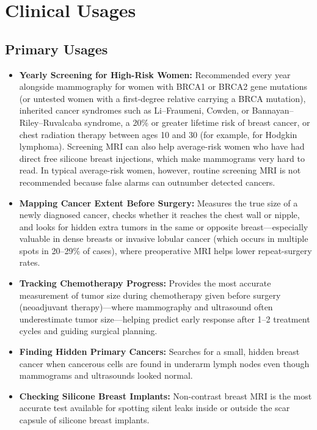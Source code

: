 \section{Clinical Usages}

\subsection{Primary Usages}
\begin{itemize}
\item \textbf{Yearly Screening for High-Risk Women:} Recommended every year alongside mammography for women with BRCA1 or BRCA2 gene mutations (or untested women with a first-degree relative carrying a BRCA mutation), inherited cancer syndromes such as Li--Fraumeni, Cowden, or Bannayan--Riley--Ruvalcaba syndrome, a 20\% or greater lifetime risk of breast cancer, or chest radiation therapy between ages 10 and 30 (for example, for Hodgkin lymphoma). Screening MRI can also help average-risk women who have had direct free silicone breast injections, which make mammograms very hard to read. In typical average-risk women, however, routine screening MRI is not recommended because false alarms can outnumber detected cancers.
\item \textbf{Mapping Cancer Extent Before Surgery:} Measures the true size of a newly diagnosed cancer, checks whether it reaches the chest wall or nipple, and looks for hidden extra tumors in the same or opposite breast---especially valuable in dense breasts or invasive lobular cancer (which occurs in multiple spots in 20--29\% of cases), where preoperative MRI helps lower repeat-surgery rates.
\item \textbf{Tracking Chemotherapy Progress:} Provides the most accurate measurement of tumor size during chemotherapy given before surgery (neoadjuvant therapy)---where mammography and ultrasound often underestimate tumor size---helping predict early response after 1--2 treatment cycles and guiding surgical planning.
\item \textbf{Finding Hidden Primary Cancers:} Searches for a small, hidden breast cancer when cancerous cells are found in underarm lymph nodes even though mammograms and ultrasounds looked normal.
\item \textbf{Checking Silicone Breast Implants:} Non-contrast breast MRI is the most accurate test available for spotting silent leaks inside or outside the scar capsule of silicone breast implants.
\end{itemize}

